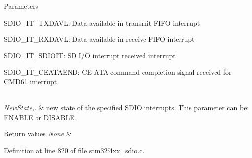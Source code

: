\begin{DoxyParams}{Parameters}
\begin{DoxyItemize}
S\-D\-I\-O\-\_\-\-I\-T\-\_\-\-T\-X\-D\-A\-V\-L\-: Data available in transmit F\-I\-F\-O interrupt \item S\-D\-I\-O\-\_\-\-I\-T\-\_\-\-R\-X\-D\-A\-V\-L\-: Data available in receive F\-I\-F\-O interrupt \item S\-D\-I\-O\-\_\-\-I\-T\-\_\-\-S\-D\-I\-O\-I\-T\-: S\-D I/\-O interrupt received interrupt \item S\-D\-I\-O\-\_\-\-I\-T\-\_\-\-C\-E\-A\-T\-A\-E\-N\-D\-: C\-E-\/\-A\-T\-A command completion signal received for C\-M\-D61 interrupt \end{DoxyItemize}
\\
\hline
{\em New\-State,\-:} & new state of the specified S\-D\-I\-O interrupts. This parameter can be\-: E\-N\-A\-B\-L\-E or D\-I\-S\-A\-B\-L\-E. \\
\hline
\end{DoxyParams}

\begin{DoxyRetVals}{Return values}
{\em None} & \\
\hline
\end{DoxyRetVals}


Definition at line 820 of file stm32f4xx\-\_\-sdio.\-c.

